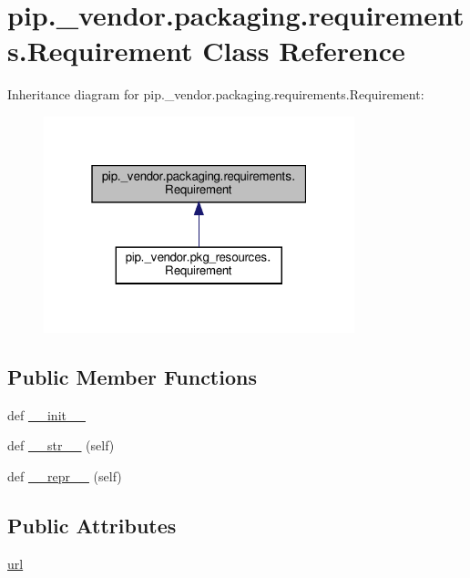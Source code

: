 \hypertarget{classpip_1_1__vendor_1_1packaging_1_1requirements_1_1Requirement}{}\section{pip.\+\_\+vendor.\+packaging.\+requirements.\+Requirement Class Reference}
\label{classpip_1_1__vendor_1_1packaging_1_1requirements_1_1Requirement}


Inheritance diagram for pip.\+\_\+vendor.\+packaging.\+requirements.\+Requirement\+:
\nopagebreak
\begin{figure}[H]
\begin{center}
\leavevmode
\includegraphics[width=256pt]{classpip_1_1__vendor_1_1packaging_1_1requirements_1_1Requirement__inherit__graph}
\end{center}
\end{figure}
\subsection*{Public Member Functions}
\begin{DoxyCompactItemize}
\item 
def \hyperlink{classpip_1_1__vendor_1_1packaging_1_1requirements_1_1Requirement_a740d1b8c423fd836a20451783e98c005}{\+\_\+\+\_\+init\+\_\+\+\_\+}
\item 
def \hyperlink{classpip_1_1__vendor_1_1packaging_1_1requirements_1_1Requirement_a877ae0bb8829fb1b97f6e5a6d31b875f}{\+\_\+\+\_\+str\+\_\+\+\_\+} (self)
\item 
def \hyperlink{classpip_1_1__vendor_1_1packaging_1_1requirements_1_1Requirement_a269bf6dc7cf82a23a0dda0056e23c5bf}{\+\_\+\+\_\+repr\+\_\+\+\_\+} (self)
\end{DoxyCompactItemize}
\subsection*{Public Attributes}
\begin{DoxyCompactItemize}
\item 
\hyperlink{classpip_1_1__vendor_1_1packaging_1_1requirements_1_1Requirement_ae9fcc103f907ab4191dcf42f2ef36daf}{url}
\end{DoxyCompactItemize}


